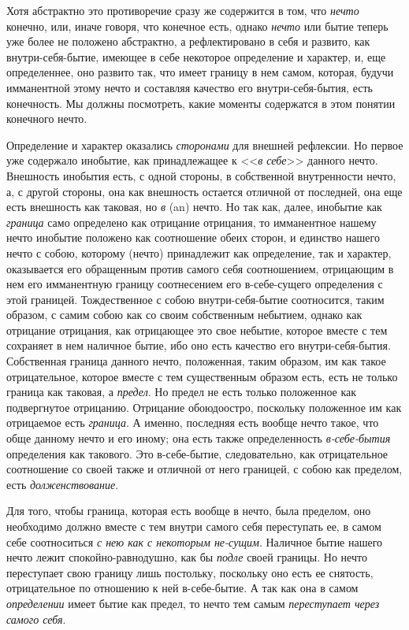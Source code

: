 \bigskip


Хотя абстрактно это противоречие сразу же содержится в том, что
{\em нечто} конечно, или, иначе говоря, что конечное
есть, однако {\em нечто} или бытие теперь уже более не
положено абстрактно, а рефлектировано в себя и развито, как
внутри-себя-бытие, имеющее в себе некоторое определение и характер, и, еще
определеннее, оно развито так, что имеет границу в нем самом, которая,
будучи имманентной этому нечто и составляя качество его внутри-себя-бытия,
есть конечность. Мы должны посмотреть, какие моменты содержатся в этом
понятии конечного нечто.

Определение и характер оказались {\em сторонами} для
внешней рефлексии. Но первое уже содержало инобытие, как принадлежащее к
<<{\em в себе}>> данного нечто. Внешность инобытия есть,
с одной стороны, в собственной внутренности нечто, а, с другой стороны, она
как внешность остается отличной от последней, она еще есть внешность как
таковая, но {\em в} (an) нечто. Но так как, далее,
инобытие как {\em граница} само определено как
отрицание отрицания, то имманентное нашему нечто инобытие положено как
соотношение обеих сторон, и единство нашего нечто с собою, которому (нечто)
принадлежит как определение, так и характер, оказывается его обращенным
против самого себя соотношением, отрицающим в нем его имманентную границу
соотнесением его в-себе-сущего определения с этой границей. Тождественное с
собою внутри-себя-бытие соотносится, таким образом, с самим собою как со
своим собственным небытием, однако как отрицание отрицания, как отрицающее
это свое небытие, которое вместе с тем сохраняет в нем наличное бытие, ибо
оно есть качество его внутри-себя-бытия. Собственная граница данного нечто,
положенная, таким образом, им как такое отрицательное, которое вместе с тем
существенным образом есть, есть не только граница как таковая, а
{\em предел}. Но предел не есть только положенное как
подвергнутое отрицанию. Отрицание обоюдоостро, поскольку положенное им как
отрицаемое есть {\em граница}. А именно, последняя есть
вообще нечто такое, что обще данному нечто и его иному; она есть также
определенность {\em в-себе-бытия} определения как
такового. Это в-себе-бытие, следовательно, как отрицательное соотношение со
своей также и отличной от него границей, с собою как пределом, есть
{\em долженствование}.

Для того, чтобы граница, которая есть вообще в нечто, была пределом, оно
необходимо должно вместе с тем внутри самого себя переступать ее, в самом
себе соотноситься {\em с нею как с некоторым не-сущим}.
Наличное бытие нашего нечто лежит спокойно-равнодушно, как бы
{\em подле} своей границы. Но нечто переступает свою
границу лишь постольку, поскольку оно есть ее снятость, отрицательное по
отношению к ней в-себе-бытие. А так как она в самом
{\em определении} имеет бытие как предел, то нечто тем
самым {\em переступает через самого себя}.

